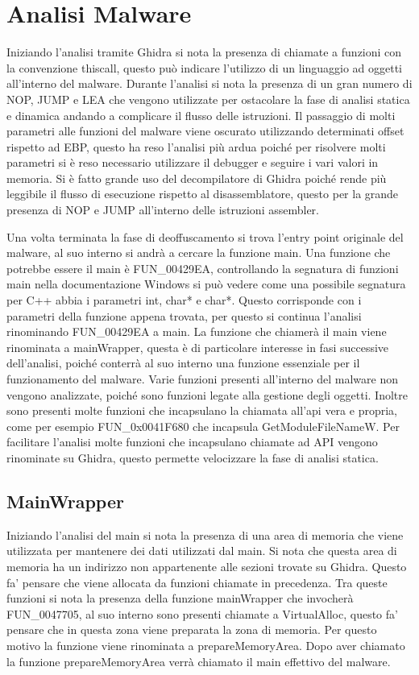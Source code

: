 \documentclass[a4paper,12pt]{article}
\begin{document}
\section{Analisi Malware}
Iniziando l'analisi tramite Ghidra si nota la presenza di chiamate a funzioni con la convenzione thiscall, questo può indicare l'utilizzo di un linguaggio ad oggetti all'interno del malware. Durante l'analisi si nota la presenza di un gran numero di NOP, JUMP e LEA che vengono utilizzate per ostacolare la fase di analisi statica e dinamica andando a complicare il flusso delle istruzioni. Il passaggio di molti parametri alle funzioni del malware viene oscurato utilizzando determinati offset rispetto ad EBP, questo ha reso l'analisi più ardua poiché per risolvere molti parametri si è reso necessario utilizzare il debugger e seguire i vari valori in memoria. Si è fatto grande uso del decompilatore di Ghidra poiché rende più leggibile il flusso di esecuzione rispetto al disassemblatore, questo per la grande presenza di NOP e JUMP all'interno delle istruzioni assembler.

Una volta terminata la fase di deoffuscamento si trova l'entry point originale del malware, al suo interno si andrà a cercare la funzione main. Una funzione che potrebbe essere il main è FUN\_00429EA, controllando la segnatura di funzioni main nella documentazione Windows si può vedere come una possibile segnatura per C++ abbia i parametri int, char* e char*. Questo corrisponde con i parametri della funzione appena trovata, per questo si continua l'analisi rinominando FUN\_00429EA a main. La funzione che chiamerà il main viene rinominata a mainWrapper, questa è di particolare interesse in fasi successive dell'analisi, poiché conterrà al suo interno una funzione essenziale per il funzionamento del malware. 
 Varie funzioni presenti all'interno del malware non vengono analizzate, poiché sono funzioni legate alla gestione degli oggetti.  Inoltre sono presenti molte funzioni che incapsulano la chiamata all'api vera e propria, come per esempio FUN\_0x0041F680 che incapsula GetModuleFileNameW. Per facilitare l'analisi molte funzioni che incapsulano chiamate ad API vengono rinominate su Ghidra, questo permette velocizzare la fase di analisi statica. 

\subsection{MainWrapper}
Iniziando l'analisi del main si nota la presenza di una area di memoria che viene utilizzata per mantenere dei dati utilizzati dal main. Si nota che questa area di memoria ha un indirizzo non appartenente alle sezioni trovate su Ghidra. Questo fa' pensare che viene allocata da funzioni chiamate in precedenza. Tra queste funzioni si nota la presenza della funzione mainWrapper che invocherà FUN\_0047705, al suo interno sono presenti chiamate a VirtualAlloc, questo fa' pensare che in questa zona viene preparata la zona di memoria. 
Per questo motivo la funzione viene rinominata a prepareMemoryArea. Dopo aver chiamato la funzione prepareMemoryArea verrà chiamato il main effettivo del malware.
\end{document}
